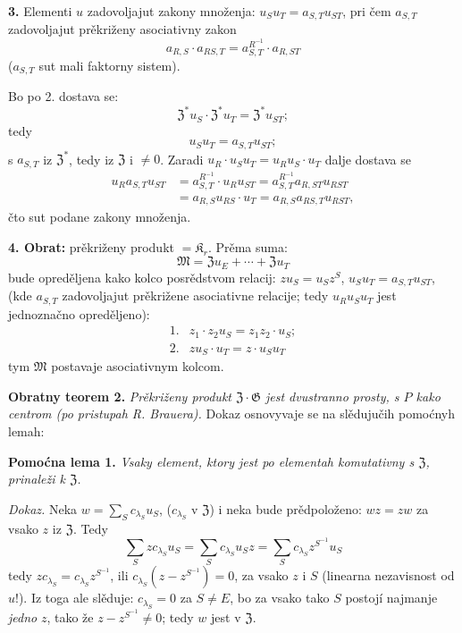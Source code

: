 \documentclass[11pt]{article}
\begin{document}
\noindent\textbf{3.} Elementi \(u\) zadovoljajut zakony množenja: \(u_Su_T=a_{S,T}u_{ST}\), pri čem \(a_{S,T}\) zadovoljajut prěkriženy asociativny zakon
\[
a_{R,S}\cdot a_{RS,T}=a_{S,T}^{R^{-1}}\cdot a_{R,ST}
\]
(\(a_{S,T}\) sut mali faktorny sistem).

Bo po 2. dostava se:
\[
\mathfrak Z^*u_S\cdot\mathfrak Z^*u_T=\mathfrak Z^*u_{ST};
\]
tedy
\[
u_Su_T=a_{S,T}u_{ST};
\]
s \(a_{S,T}\) iz \(\mathfrak Z^*\), tedy iz \(\mathfrak Z\) i \(\neq0\). Zaradi \(u_R\cdot u_Su_T=u_Ru_S\cdot u_T\) dalje dostava se
\[
\begin{aligned}
u_Ra_{S,T}u_{ST}
&=a_{S,T}^{R^{-1}}\cdot u_Ru_{ST}
 =a_{S,T}^{R^{-1}}a_{R,ST}u_{RST}\\
&=a_{R,S}u_{RS}\cdot u_T
 =a_{R,S}a_{RS,T}u_{RST},
\end{aligned}
\]
čto sut podane zakony množenja.

\noindent\textbf{4. Obrat:} prěkriženy produkt \(=\mathfrak K_r\). Prěma suma:
\[
\mathfrak M=\mathfrak Zu_E+\cdots+\mathfrak Zu_T
\]
bude opreděljena kako kolco posrědstvom relacij: \(zu_S=u_Sz^S\), \(u_Su_T=a_{S,T}u_{ST}\), (kde \(a_{S,T}\) zadovoljajut prěkrižene asociativne relacije; tedy \(u_Ru_Su_T\) jest jednoznačno opreděljeno):
\[
\begin{array}{ll}
1.&z_1\cdot z_2u_S=z_1z_2\cdot u_S;\\[2pt]
2.&zu_S\cdot u_T=z\cdot u_Su_T
\end{array}
\]
tym \(\mathfrak M\) postavaje asociativnym kolcom.

\noindent\textbf{Obratny teorem 2.} \emph{Prěkriženy produkt \(\mathfrak Z\cdot\mathfrak G\) jest dvustranno prosty, s \(P\) kako centrom (po pristupah R. Brauera).} Dokaz osnovyvaje se na slědujučih pomoćnyh lemah:

\noindent\textbf{Pomoćna lema 1.} \emph{Vsaky element, ktory jest po elementah komutativny s \(\mathfrak Z\), prinaleži k \(\mathfrak Z\).}

\noindent\emph{Dokaz.} Neka \(w=\sum_S c_{\lambda_S}u_S\), (\(c_{\lambda_S}\) v \(\mathfrak Z\)) i neka bude prědpoloženo: \(wz=zw\) za vsako \(z\) iz \(\mathfrak Z\). Tedy
\[
\sum_S zc_{\lambda_S}u_S
 =\sum_S c_{\lambda_S}u_Sz
 =\sum_S c_{\lambda_S}z^{S^{-1}}u_S
\]
tedy \(zc_{\lambda_S}=c_{\lambda_S}z^{S^{-1}}\), ili \(c_{\lambda_S}(z-z^{S^{-1}})=0\), za vsako \(z\) i \(S\) (linearna nezavisnost od \(u\)!). Iz toga ale slěduje: \(c_{\lambda_S}=0\) za \(S\neq E\), bo za vsako tako \(S\) postojí najmanje \emph{jedno} \(z\), tako že \(z-z^{S^{-1}}\neq0\); tedy \(w\) jest v \(\mathfrak Z\).
\end{document}
